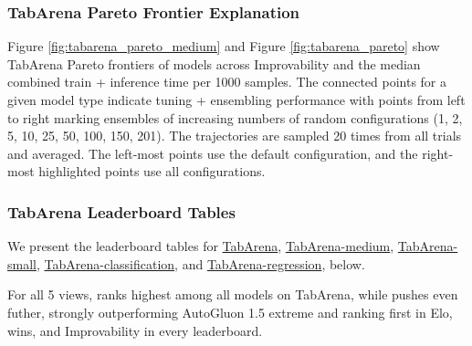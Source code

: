 \subsubsection{TabArena Pareto Frontier Explanation}
\label{app:tabarena_pareto_frontier_explanation}

Figure \ref{fig:tabarena_pareto_medium} and Figure \ref{fig:tabarena_pareto} show TabArena Pareto frontiers of models across Improvability and the median combined train + inference time per 1000 samples. The connected points for a given model type indicate tuning + ensembling performance with points from left to right marking ensembles of increasing numbers of random configurations (1, 2, 5, 10, 25, 50, 100, 150, 201). The trajectories are sampled 20 times from all
trials and averaged. The left-most points use the default configuration, and the right-most highlighted points use all configurations.

\subsubsection{TabArena Leaderboard Tables}
\label{sec:tabarena_leaderboard_tables}

We present the leaderboard tables for
\hyperref[tab:tabarena_table]{TabArena},
\hyperref[tab:tabarena_medium_table]{TabArena-medium},
\hyperref[tab:tabarena_small_table]{TabArena-small}, \hyperref[tab:tabarena_classification_table]{TabArena-classification}, and \hyperref[tab:tabarena_regression_table]{TabArena-regression}, below.

For all 5 views, \ourmodel ranks highest among all models on TabArena, while \ourmodelenhanced pushes even futher, strongly outperforming AutoGluon 1.5 extreme and ranking first in Elo, wins, and Improvability in every leaderboard.

\begin{table}[H]
\centering
\caption{\textbf{TabArena leaderboard using all 51 datasets with 816 total tasks.}}
\label{tab:tabarena_table}

\end{table}
\begin{table}[H]
\centering
\caption{\textbf{TabArena-medium leaderboard on the 15 largest datasets in TabArena}, with 10k--100k training samples, evaluated on the full 135 tasks with 9 splits per dataset.}
\label{tab:tabarena_medium_table}

\end{table}

\begin{table}[H]
\centering
\caption{\textbf{TabArena-small leaderboard on the 36 smallest datasets in TabArena}, with 500--10k training samples, evaluated on the full 681 tasks.}
\label{tab:tabarena_small_table}

\end{table}

